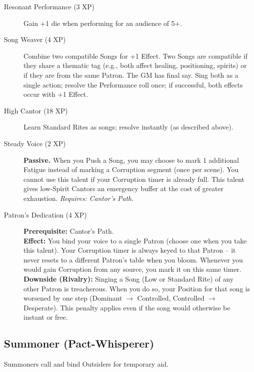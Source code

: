 \begin{description}
  \item[Resonant Performance (3 XP)] Gain +1 die when performing for an audience of 5+.

  \item[Song Weaver (4 XP)] Combine two compatible Songs for +1 Effect. Two Songs are compatible if they share a thematic tag (e.g., both affect healing, positioning, spirits) or if they are from the same Patron. The GM has final say. Sing both as a single action; resolve the Performance roll once; if successful, both effects occur with +1 Effect.

  \item[High Cantor (18 XP)] Learn Standard Rites as songs; resolve instantly (as described above).

  \item[Steady Voice (2 XP)] \textbf{Passive.} When you Push a Song, you may choose to mark 1 additional Fatigue instead of marking a Corruption segment (once per scene). You cannot use this talent if your Corruption timer is already full. This talent gives low-Spirit Cantors an emergency buffer at the cost of greater exhaustion. \textit{Requires: Cantor's Path.}

  \item[Patron's Dedication (4 XP)] \textbf{Prerequisite:} Cantor's Path. \\
  \textbf{Effect:} You bind your voice to a single Patron (choose one when you take this talent). Your Corruption timer is always keyed to that Patron -- it never resets to a different Patron's table when you bloom. Whenever you would gain Corruption from any source, you mark it on this same timer. \\
  \textbf{Downside (Rivalry):} Singing a Song (Low or Standard Rite) of any other Patron is treacherous. When you do so, your Position for that song is worsened by one step (Dominant \(\rightarrow\) Controlled, Controlled \(\rightarrow\) Desperate). This penalty applies even if the song would otherwise be instant or free.
\end{description}

\subsection{Summoner (Pact-Whisperer)}
\label{sec:summoner}

Summoners call and bind Outsiders for temporary aid.

